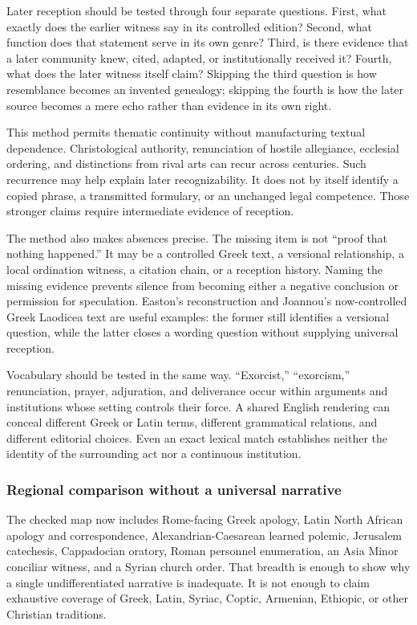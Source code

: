 Later reception should be tested through four separate questions. First, what
exactly does the earlier witness say in its controlled edition? Second, what
function does that statement serve in its own genre? Third, is there evidence
that a later community knew, cited, adapted, or institutionally received it?
Fourth, what does the later witness itself claim? Skipping the third question
is how resemblance becomes an invented genealogy; skipping the fourth is how
the later source becomes a mere echo rather than evidence in its own right.

This method permits thematic continuity without manufacturing textual
dependence. Christological authority, renunciation of hostile allegiance,
ecclesial ordering, and distinctions from rival arts can recur across
centuries. Such recurrence may help explain later recognizability. It does not
by itself identify a copied phrase, a transmitted formulary, or an unchanged
legal competence. Those stronger claims require intermediate evidence of
reception.

The method also makes absences precise. The missing item is not ``proof that
nothing happened.'' It may be a controlled Greek text, a versional
relationship, a local ordination witness, a citation chain, or a reception
history. Naming the missing evidence prevents silence from becoming either a
negative conclusion or permission for speculation. Easton's reconstruction
and Joannou's now-controlled Greek Laodicea text are useful examples: the
former still identifies a versional question, while the latter closes a
wording question without supplying universal reception.

Vocabulary should be tested in the same way. ``Exorcist,'' ``exorcism,''
renunciation, prayer, adjuration, and deliverance occur within arguments and
institutions whose setting controls their force. A shared English rendering
can conceal different Greek or Latin terms, different grammatical relations,
and different editorial choices. Even an exact lexical match establishes
neither the identity of the surrounding act nor a continuous institution.

\subsubsection{Regional comparison without a universal narrative}

The checked map now includes Rome-facing Greek apology, Latin North African
apology and correspondence, Alexandrian-Caesarean learned polemic, Jerusalem
catechesis, Cappadocian oratory, Roman personnel enumeration, an Asia Minor
conciliar witness, and a Syrian church order. That breadth is enough to show
why a single undifferentiated narrative is inadequate. It is not enough to
claim exhaustive coverage of Greek, Latin, Syriac, Coptic, Armenian,
Ethiopic, or other Christian traditions.

